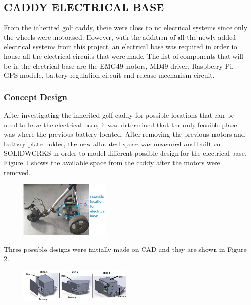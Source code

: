 \documentclass[11pt,landscape]{article}
\begin{document}
\newpage
\begin{multicols}{2}
    \subsection{CADDY ELECTRICAL BASE}
    From the inherited golf caddy, there were close to no electrical systems
    since only the wheels were motorised. However, with the addition of all the
    newly added electrical systems from this project, an electrical base was
    required in order to house all the electrical circuits that were made. The
    list of components that will be in the electrical base are the EMG49 motors,
    MD49 driver, Raspberry Pi, GPS module, battery regulation circuit and
    release mechanism circuit.
    
    \subsubsection{Concept Design}
    After investigating the inherited golf caddy for possible locations that can
    be used to have the electrical base, it was determined that the only
    feasible place was where the previous battery located. After removing the
    previous motors and battery plate holder, the new allocated space was
    measured and built on SOLIDWORKS in order to model different possible design
    for the electrical base. Figure \ref{fig:base} shows the available space
    from the caddy after the motors were removed.
    
    \begin{figure}[H]
        \begin{center}
            \includegraphics[width=0.4\textwidth]{Figure22.jpg}
            \label{fig:base}
        \end{center}
    \end{figure}
    
    Three possible designs were initially made on CAD and they are shown in
    Figure \ref{fig:box}.
    
    \begin{figure}[H]
        \begin{center}
            \includegraphics[width=0.5\textwidth]{Figure23.jpg}
            \label{fig:box}
        \end{center}
    \end{figure}
    

\end{multicols}
\end{document}
